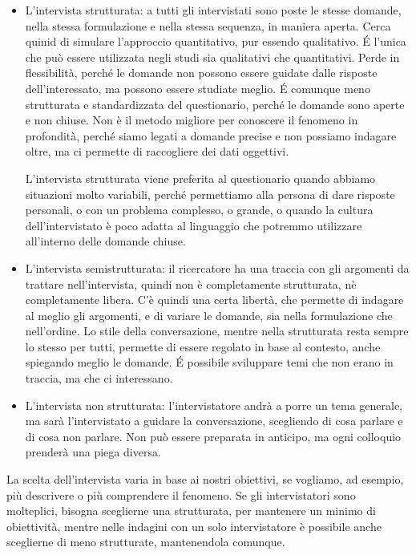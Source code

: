 \begin{itemize}
\item L'intervista strutturata: a tutti gli intervistati sono poste le stesse domande, nella stessa formulazione e nella stessa sequenza, in maniera aperta. Cerca quinid di simulare l'approccio quantitativo, pur essendo qualitativo. \'E l'unica che può essere utilizzata negli studi sia qualitativi che quantitativi. Perde in flessibilità, perché le domande non possono essere guidate dalle risposte dell'interessato, ma possono essere studiate meglio. \'E comunque meno strutturata e standardizzata del questionario, perché le domande sono aperte e non chiuse. Non è il metodo migliore per conoscere il fenomeno in profondità, perché siamo legati a domande precise e non possiamo indagare oltre, ma ci permette di raccogliere dei dati oggettivi.

L'intervista strutturata viene preferita al questionario quando abbiamo situazioni molto variabili, perché permettiamo alla persona di dare risposte personali, o con un problema complesso, o grande, o quando la cultura dell'intervistato è poco adatta al linguaggio che potremmo utilizzare all'interno delle domande chiuse.

\item L'intervista semistrutturata: il ricercatore ha una traccia con gli argomenti da trattare nell'intervista, quindi non è completamente strutturata, nè completamente libera. C'è quindi una certa libertà, che permette di indagare al meglio gli argomenti, e di variare le domande, sia nella formulazione che nell'ordine.
Lo stile della conversazione, mentre nella strutturata resta sempre lo stesso per tutti, permette di essere regolato in base al contesto, anche spiegando meglio le domande. \'E possibile sviluppare temi che non erano in traccia, ma che ci interessano.

\item L'intervista non strutturata: l'intervistatore andrà a porre un tema generale, ma sarà l'intervistato a guidare la conversazione, scegliendo di cosa parlare e di cosa non parlare. Non può essere preparata in anticipo, ma ogni colloquio prenderà una piega diversa.
\end{itemize}

La scelta dell'intervista varia in base ai nostri obiettivi, se vogliamo, ad esempio, più descrivere o più comprendere il fenomeno. Se gli intervistatori sono molteplici, bisogna sceglierne una strutturata, per mantenere un minimo di obiettività, mentre nelle indagini con un solo intervistatore è possibile anche sceglierne di meno strutturate, mantenendola comunque.

